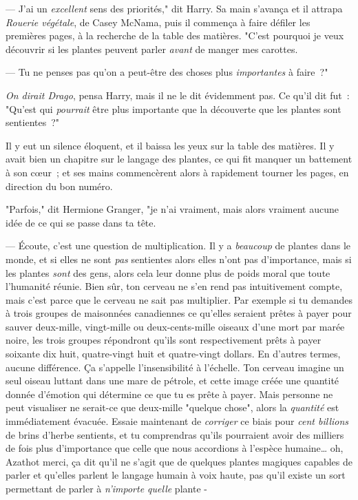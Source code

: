 --- J'ai un \emph{excellent} sens des priorités," dit Harry. Sa main s'avança et il attrapa \emph{Rouerie végétale}, de Casey McNama, puis il commença à faire défiler les premières pages, à la recherche de la table des matières. "C'est pourquoi je veux découvrir si les plantes peuvent parler \emph{avant} de manger mes carottes.

--- Tu ne penses pas qu'on a peut-être des choses plus \emph{importantes} à faire~?"

\emph{On dirait Drago}, pensa Harry, mais il ne le dit évidemment pas. Ce qu'il dit fut~: "Qu'est qui \emph{pourrait} être plus importante que la découverte que les plantes sont sentientes~?"

Il y eut un silence éloquent, et il baissa les yeux sur la table des matières. Il y avait bien un chapitre sur le langage des plantes, ce qui fit manquer un battement à son cœur~; et ses mains commencèrent alors à rapidement tourner les pages, en direction du bon numéro.

"Parfois," dit Hermione Granger, "je n'ai vraiment, mais alors vraiment aucune idée de ce qui se passe dans ta tête.

--- Écoute, c'est une question de multiplication. Il y a \emph{beaucoup} de plantes dans le monde, et si elles ne sont \emph{pas} sentientes alors elles n'ont pas d'importance, mais si les plantes \emph{sont} des gens, alors cela leur donne plus de poids moral que toute l'humanité réunie. Bien sûr, ton cerveau ne s'en rend pas intuitivement compte, mais c'est parce que le cerveau ne sait pas multiplier. Par exemple si tu demandes à trois groupes de maisonnées canadiennes ce qu'elles seraient prêtes à payer pour sauver deux-mille, vingt-mille ou deux-cents-mille oiseaux d'une mort par marée noire, les trois groupes répondront qu'ils sont respectivement prêts à payer soixante dix huit, quatre-vingt huit et quatre-vingt dollars. En d'autres termes, aucune différence. Ça s'appelle l'insensibilité à l'échelle. Ton cerveau imagine un seul oiseau luttant dans une mare de pétrole, et cette image créée une quantité donnée d'émotion qui détermine ce que tu es prête à payer. Mais personne ne peut visualiser ne serait-ce que deux-mille "quelque chose", alors la \emph{quantité} est immédiatement évacuée. Essaie maintenant de \emph{corriger} ce biais pour \emph{cent billions} de brins d'herbe sentients, et tu comprendras qu'ils pourraient avoir des milliers de fois plus d'importance que celle que nous accordions à l'espèce humaine… oh, Azathot merci, ça dit qu'il ne s'agit que de quelques plantes magiques capables de parler et qu'elles parlent le langage humain à voix haute, pas qu'il existe un sort permettant de parler à \emph{n'importe quelle} plante -

